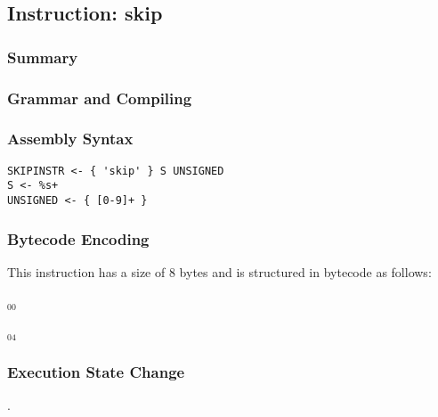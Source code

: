 \subsection{Instruction: skip}

\subsubsection{Summary}


\subsubsection{Grammar and Compiling}


\subsubsection{Assembly Syntax}

\begin{myquote}
\begin{verbatim}
SKIPINSTR <- { 'skip' } S UNSIGNED
S <- %s+
UNSIGNED <- { [0-9]+ }
\end{verbatim}
\end{myquote}

\subsubsection{Bytecode Encoding}

This instruction has a size of 8 bytes and is structured in bytecode as follows:

$_{00}$\ 



$_{04}$\ 


\subsubsection{Execution State Change}

.


